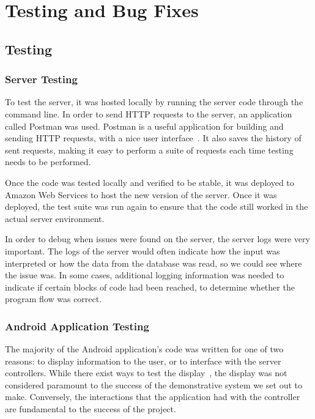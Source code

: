 \documentclass[12pt]{report}
\let\Oldsection\section
\renewcommand{\section}{\FloatBarrier\Oldsection}
\let\Oldsubsection\subsection
\renewcommand{\subsection}{\FloatBarrier\Oldsubsection}
\begin{document}

\chapter{Testing and Bug Fixes} \label{testing-and-bug-fixes}

\section{Testing} \label{testing}

\subsection{Server Testing} \label{server-testing}

To test the server, it was hosted locally by running the server code through the command line.
In order to send HTTP requests to the server, an application called Postman was used. Postman
is a useful application for building and sending HTTP requests, with a nice user interface~\autocite{POSTMAN}.
It also saves the history of sent requests, making it easy to perform a suite of requests
each time testing needs to be performed.

Once the code was tested locally and verified to be stable, it was deployed to Amazon Web
Services to host the new version of the server. Once it was deployed, the test suite was
run again to ensure that the code still worked in the actual server environment.

In order to debug when issues were found on the server, the server logs were very important.
The logs of the server would often indicate how the input was interpreted or how the data
from the database was read, so we could see where the issue was. In some cases, additional
logging information was needed to indicate if certain blocks of code had been reached, to 
determine whether the program flow was correct.

\subsection{Android Application Testing} \label{android-application-testing}

The majority of the Android application's code was written for one of two reasons: to display information to the user,
or to interface with the server controllers. While there exist ways to test the display~\autocite{ANDROIDUITEST}, the
display was not considered paramount to the success of the demonstrative system we set out to make. Conversely, the
interactions that the application had with the controller are fundamental to the success of the project.
\end{document}
